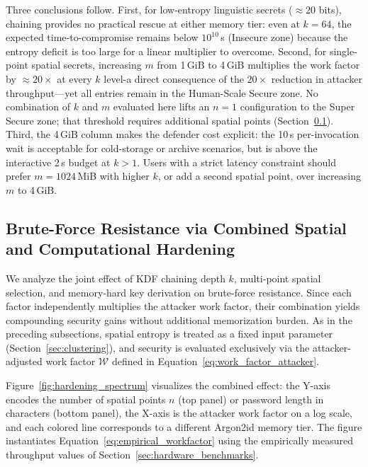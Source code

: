 \documentclass[mathematics,article,accept,pdftex,moreauthors]{Definitions/mdpi}
\begin{document}
{Three conclusions follow. First, for low-entropy linguistic secrets ($\approx$20 bits), chaining provides no practical rescue at either memory tier: even at $k=64$, the expected time-to-compromise remains below $10^{10}$\,s (Insecure zone) because the entropy deficit is too large for a linear multiplier to overcome. Second, for single-point spatial secrets, increasing $m$ from 1\,GiB to 4\,GiB multiplies the work factor by $\approx\!20\times$ at every $k$ level-a direct consequence of the $20\times$ reduction in attacker throughput---yet all entries remain in the Human-Scale Secure zone. No combination of $k$ and $m$ evaluated here lifts an $n=1$ configuration to the Super Secure zone;
 that threshold requires additional spatial points (Section~\ref{sec:defense_in_depth}). Third, the 4\,GiB column makes the defender cost explicit: the 10\,s per-invocation wait is acceptable for cold-storage or archive scenarios, but is above the interactive 2\,s budget at $k>1$. Users with a strict latency constraint should prefer $m=1024$\,MiB with higher $k$, or add a second spatial point, over increasing $m$ to 4\,GiB.}


\subsection{Brute-Force Resistance via Combined Spatial and Computational Hardening}
\label{sec:defense_in_depth}

{We analyze the joint effect of KDF chaining depth $k$, multi-point spatial selection, and memory-hard key derivation on brute-force resistance. Since each factor independently multiplies the attacker work factor, their combination yields compounding security gains without additional memorization burden.} As in the preceding subsections, spatial entropy is treated as a fixed input parameter (Section~\ref{sec:clustering}), and security is evaluated exclusively via the attacker-adjusted work factor $\mathcal{W}$ defined in Equation~\eqref{eq:work_factor_attacker}.

Figure~\ref{fig:hardening_spectrum} visualizes the combined effect: the Y-axis encodes the number of spatial points $n$ (top panel) or password length in characters (bottom panel), the X-axis is the attacker work factor on a log scale, and each colored line corresponds to a different Argon2id memory tier. The figure instantiates Equation~\eqref{eq:empirical_workfactor} using the empirically measured throughput values of Section~\ref{sec:hardware_benchmarks}.
\end{document}
